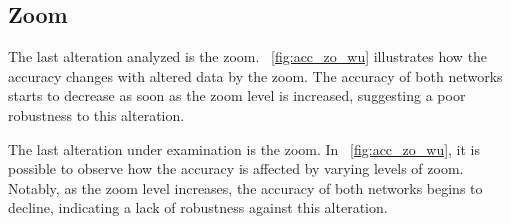 \subsection{Zoom}

The last alteration analyzed is the zoom. \Fig~\ref{fig:acc_zo_wu} illustrates how the accuracy changes with altered data by the zoom. The accuracy of both networks starts to decrease as soon as the zoom level is increased, suggesting a poor robustness to this alteration.

The last alteration under examination is the zoom. In \Fig~\ref{fig:acc_zo_wu}, it is possible to observe how the accuracy is affected by varying levels of zoom. Notably, as the zoom level increases, the accuracy of both networks begins to decline, indicating a lack of robustness against this alteration.

